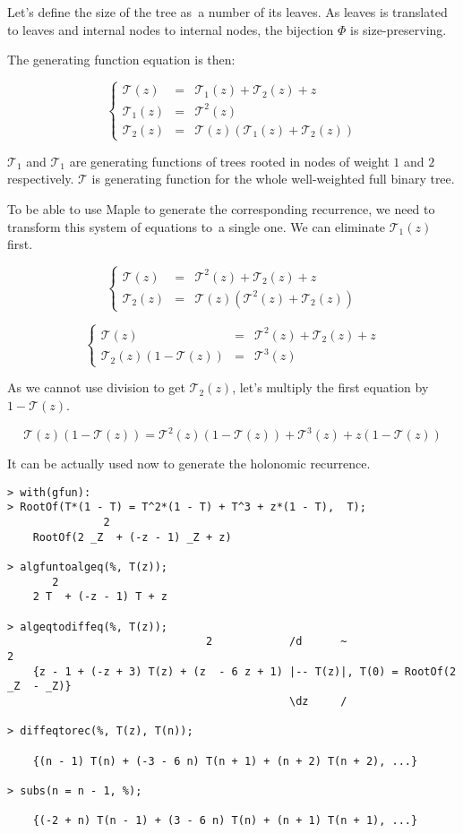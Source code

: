 \documentclass[final]{article}
\theoremstyle{definition}
\theoremstyle{definition}
\theoremstyle{remark}
\newcommand{\gf}[1]{\ensuremath{\mathcal{#1}}}
\begin{document}
Let's define the size of the tree as~a number of its leaves. As leaves is translated to leaves and internal nodes to internal nodes, the bijection \(\Phi\) is size-preserving.

The generating function equation is then:

\[\left\{\begin{array}{rcl}
            \gf{T}(z) &=& \gf{T}_1(z) + \gf{T}_2(z) + z\\
            \gf{T}_1(z) &=& \gf{T}^2(z)\\
            \gf{T}_2(z) &=& \gf{T}(z)(\gf{T}_1(z) + \gf{T}_2(z))
\end{array}\right.\]

\(\gf{T}_1\) and \(\gf{T}_1\) are generating functions of trees rooted in nodes of weight \(1\) and \(2\) respectively. \(\gf{T}\) is generating function for the whole well-weighted full binary tree.

To be able to use Maple to generate the corresponding recurrence, we need to transform this system of equations to~a single one. We can eliminate \(\gf{T}_1(z)\) first.

\[\left\{\begin{array}{rcl}
            \gf{T}(z) &=& \gf{T}^2(z) + \gf{T}_2(z) + z\\
            \gf{T}_2(z) &=& \gf{T}(z)(\gf{T}^2(z) + \gf{T}_2(z))
\end{array}\right.\]

\[\left\{\begin{array}{rcl}
            \gf{T}(z) &=& \gf{T}^2(z) + \gf{T}_2(z) + z\\
            \gf{T}_2(z)(1 - \gf{T}(z)) &=& \gf{T}^3(z)
\end{array}\right.\]

As we cannot use division to get \(\gf{T}_2(z)\), let's multiply the first equation by \(1 - \gf{T}(z)\).

\[\gf{T}(z)(1 - \gf{T}(z)) = \gf{T}^2(z)(1 - \gf{T}(z)) + \gf{T}^3(z) + z(1 - \gf{T}(z))\]

It can be actually used now to generate the holonomic recurrence.

\begin{lstlisting}
> with(gfun):
> RootOf(T*(1 - T) = T^2*(1 - T) + T^3 + z*(1 - T),  T);
               2
    RootOf(2 _Z  + (-z - 1) _Z + z)

> algfuntoalgeq(%, T(z));
       2
    2 T  + (-z - 1) T + z

> algeqtodiffeq(%, T(z));
                               2            /d      ~                   2
    {z - 1 + (-z + 3) T(z) + (z  - 6 z + 1) |-- T(z)|, T(0) = RootOf(2 _Z  - _Z)}
                                            \dz     /

> diffeqtorec(%, T(z), T(n));

    {(n - 1) T(n) + (-3 - 6 n) T(n + 1) + (n + 2) T(n + 2), ...}

> subs(n = n - 1, %);

    {(-2 + n) T(n - 1) + (3 - 6 n) T(n) + (n + 1) T(n + 1), ...}
\end{lstlisting}
\end{document}
